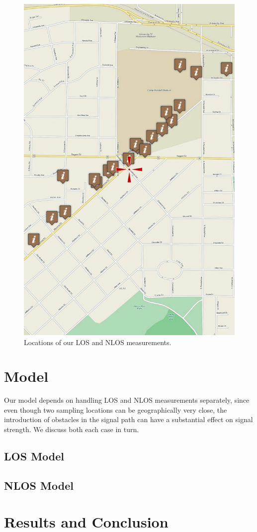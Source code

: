 \documentclass[12pt]{article}
\begin{document}
\begin{figure}[t]
\center
\includegraphics[width=.5\linewidth]{locations}
\caption{Locations of our LOS and NLOS measurements.}
\label{fig:locations}
\end{figure}

\section{Model}
Our model depends on handling LOS and NLOS measurements separately, since even
though two sampling locations can be geographically very close, the introduction
of obstacles in the signal path can have a substantial effect on signal
strength. We discuss both each case in turn.

\subsection{LOS Model}


\subsection{NLOS Model}

\section{Results and Conclusion}

%
%
\end{document}
